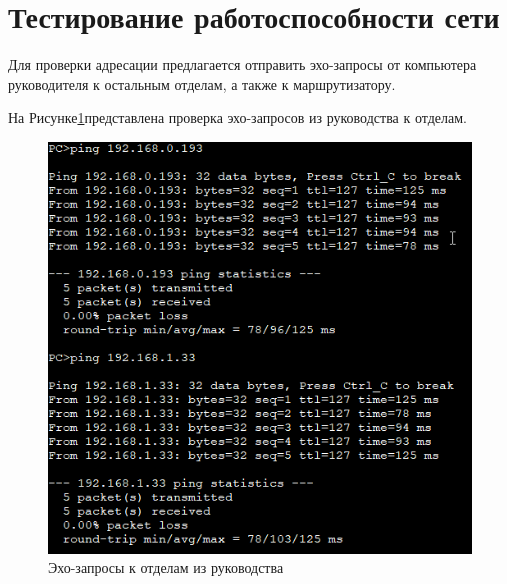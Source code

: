 \documentclass[14pt, a4paper]{extarticle}
\begin{document}
\section{Тестирование работоспособности сети}

Для проверки адресации предлагается отправить эхо-запросы от компьютера руководителя к остальным отделам, а также к маршрутизатору.

На Рисунке\;\ref{fig:first}представлена проверка эхо-запросов из руководства к отделам.
\begin{figure}[H]
\centering
\includegraphics[scale=0.7]{misc/first}
\caption{Эхо-запросы к отделам из руководства\label{fig:first}}
\end{figure}
\end{document}
